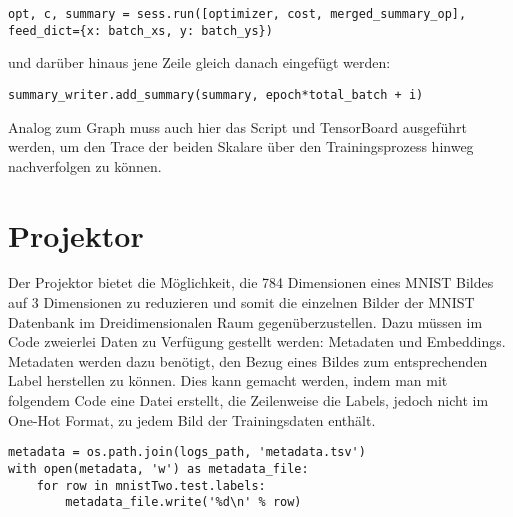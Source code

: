 \begin{lstlisting}
opt, c, summary = sess.run([optimizer, cost, merged_summary_op], feed_dict={x: batch_xs, y: batch_ys})
\end{lstlisting}

und darüber hinaus jene Zeile gleich danach eingefügt werden:             

\lstset{language=Python}

\begin{lstlisting}
summary_writer.add_summary(summary, epoch*total_batch + i)
\end{lstlisting}


Analog zum Graph muss auch hier das Script und TensorBoard ausgeführt werden, um den Trace der beiden Skalare über den Trainingsprozess hinweg nachverfolgen zu können.

\section{Projektor}

Der Projektor bietet die Möglichkeit, die 784 Dimensionen eines MNIST Bildes auf 3 Dimensionen zu reduzieren und somit die einzelnen Bilder der MNIST Datenbank im Dreidimensionalen Raum gegenüberzustellen. Dazu müssen im Code zweierlei Daten zu Verfügung gestellt werden: Metadaten und Embeddings. Metadaten werden dazu benötigt, den Bezug eines Bildes zum entsprechenden Label herstellen zu können. Dies kann gemacht werden, indem man mit folgendem Code eine Datei erstellt, die Zeilenweise die Labels, jedoch nicht im One-Hot Format, zu jedem Bild der Trainingsdaten enthält.

\lstset{language=Python}

\begin{lstlisting}
metadata = os.path.join(logs_path, 'metadata.tsv')
with open(metadata, 'w') as metadata_file:
    for row in mnistTwo.test.labels:
        metadata_file.write('%d\n' % row)
\end{lstlisting}

